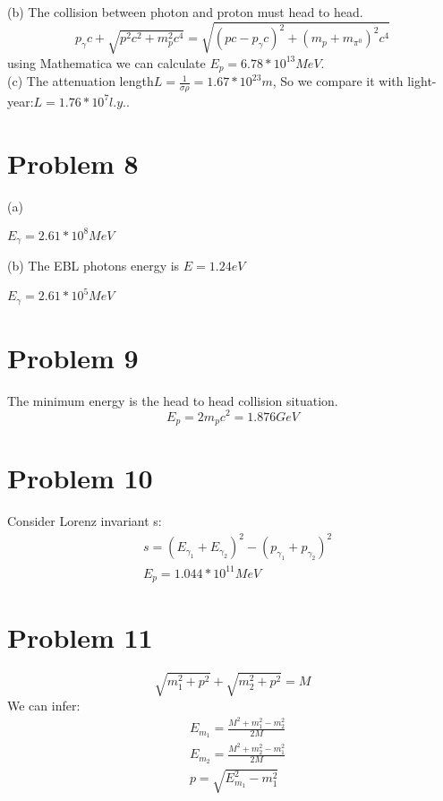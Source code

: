 \documentclass{article}
\begin{document}
\begin{CJK*}{GBK}{song}
(b)
The collision between photon and proton must head to head.
\begin{equation}
p_{\gamma}c+\sqrt{p^2c^2+m_p^2c^4}=\sqrt{(pc-p_{\gamma}c)^2+(m_p+m_{\pi^0})^2c^4}
\end{equation}
using Mathematica we can calculate $E_p=6.78*10^{13}MeV$.\\

(c)
The attenuation length$L=\frac{1}{\sigma\rho}=1.67*10^{23}m$, So we compare it  with light-year:$L=1.76*10^{7}l.y.$. 

\section{Problem 8}
(a)
\begin{center}
$
E_{\gamma}=2.61*10^8MeV
$
\end{center}
(b)
The EBL photons energy is $E=1.24eV$
\begin{center}
$
E_{\gamma}=2.61*10^5MeV
$
\end{center}

\section{Problem 9}
The minimum energy is the head to head collision situation.
\begin{equation}
E_p=2m_pc^2=1.876GeV
\end{equation}

\section{Problem 10}
Consider Lorenz invariant s:
\begin{equation}
\begin{aligned}
&s=(E_{\gamma_1}+E_{\gamma_2})^2-(p_{\gamma_1}+p_{\gamma_2})^2\\
&E_p=1.044*10^{11}MeV
\end{aligned}
\end{equation}

\section{Problem 11}
\begin{equation}
\sqrt{m_1^2+p^2}+\sqrt{m_2^2+p^2}=M
\end{equation}
We can infer:
\begin{equation} 
\begin{aligned}
&E_{m_1}=\frac{M^2+m_1^2-m_2^2}{2M}\\
&E_{m_2}=\frac{M^2+m_2^2-m_1^2}{2M}\\
&p=\sqrt{E_{m_1}^2-m_1^2}
\end{aligned}
\end{equation}


\end{CJK*}
\end{document}
